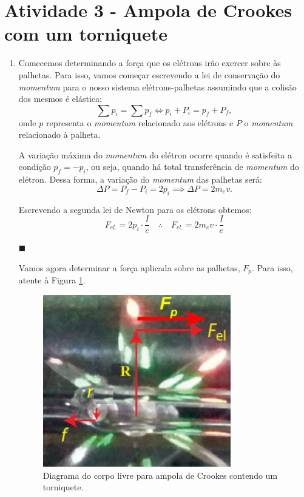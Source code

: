 \documentclass[12pt,a4paper]{article}
\begin{document}
\section*{Atividade 3 - Ampola de Crookes com um torniquete}
\begin{enumerate}

    \item Comecemos determinando a força que os elétrons irão exercer sobre às palhetas. Para isso, vamos começar escrevendo a lei de conservação do \textit{momentum} para o nosso sistema elétrons-palhetas assumindo que a colisão dos mesmos é elástica:
    \begin{equation} \label{eq:Conserv.Momentum}
        \sum p_i=\sum p_f\iff p_i+P_i=p_f+P_f,
    \end{equation}
    onde $p$ representa o \textit{momentum} relacionado aos elétrons e $P$ o \textit{momentum} relacionado à palheta.

    A variação máxima do \textit{momentum} do elétron ocorre quando é satisfeita a condição $p_f=-p_i$, ou seja, quando há total transferência de \textit{momentum} do elétron. Dessa forma, a variação do \textit{momentum} das palhetas será:
    \begin{equation} \label{eq:Delta P}
        \Delta P=P_f-P_i=2p_i\implies\Delta P=2m_e v.
    \end{equation}

    Escrevendo a segunda lei de Newton para os elétrons obtemos:
    \begin{equation} \label{eq:F_el}
        F_{el.}=2p_i\cdot\frac{I}{e}\quad\therefore\quad\boxed{F_{el.}=2m_e v\cdot\frac{I}{e}} 
    \end{equation}
    \begin{flushright}
        $\blacksquare$
    \end{flushright}
    
    Vamos agora determinar a força aplicada sobre as palhetas, $F_p$. Para isso, atente à Figura \ref{fig:Cathode_Wheel_article}. 
    \begin{figure}[htp!]
        \centering
        \includegraphics[width=0.7\linewidth]{Figures/Cathode_Wheel.png}
        \caption{Diagrama do corpo livre para ampola de Crookes contendo um torniquete.}
        \label{fig:Cathode_Wheel_article}
    \end{figure} 


\end{enumerate}
\end{document}
